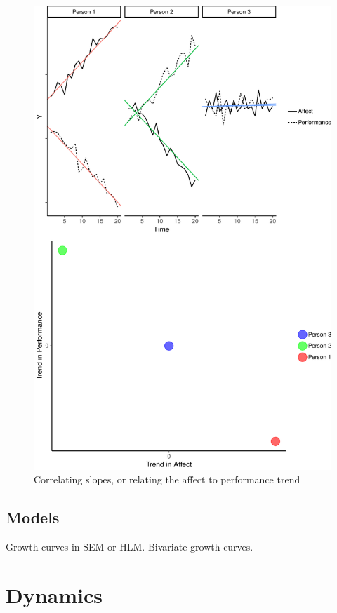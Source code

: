 \documentclass[english,,man]{apa6}
\theoremstyle{definition}
\theoremstyle{definition}
\theoremstyle{definition}
\theoremstyle{remark}
\begin{document}
\begin{figure}
\centering
\includegraphics{figures/unnamed-chunk-14-1.pdf}
\caption{\label{fig:unnamed-chunk-14}Correlating slopes, or relating the
affect to performance trend\label{trend_relation}}
\end{figure}

\hypertarget{models-1}{%
\subsection{Models}\label{models-1}}

Growth curves in SEM or HLM. Bivariate growth curves.

\hypertarget{dynamics}{%
\section{Dynamics}\label{dynamics}}
\end{document}
